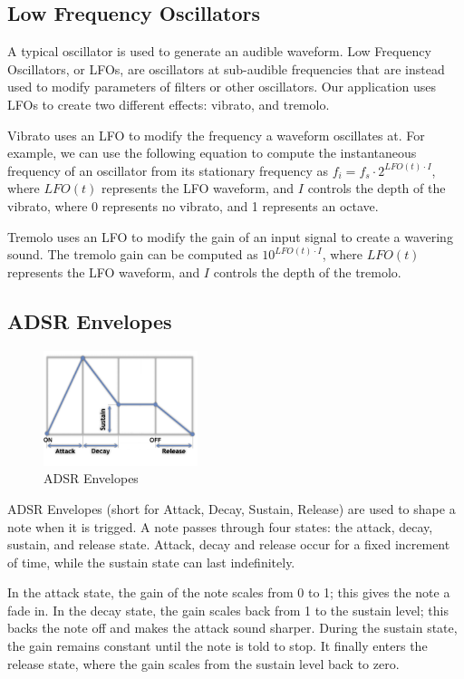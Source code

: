 \documentclass[letterpaper,12pt]{article}
\begin{document}
\subsection{Low Frequency Oscillators}

A typical oscillator is used to generate an audible waveform. Low Frequency Oscillators, or LFOs, are oscillators at sub-audible frequencies that are instead used to modify parameters of filters or other oscillators. Our application uses LFOs to create two different effects: vibrato, and tremolo.

Vibrato uses an LFO to modify the frequency a waveform oscillates at. For example, we can use the following equation to compute the instantaneous frequency of an oscillator from its stationary frequency as $f_i = f_s \cdot 2^{LFO(t) \cdot I}$, where $LFO(t)$ represents the LFO waveform, and $I$ controls the depth of the vibrato, where 0 represents no vibrato, and 1 represents an octave.

Tremolo uses an LFO to modify the gain of an input signal to create a wavering sound. The tremolo gain can be computed as $10^{LFO(t) \cdot I}$, where $LFO(t)$ represents the LFO waveform, and $I$ controls the depth of the tremolo.


\subsection{ADSR Envelopes}

\begin{figure}
\centering
\includegraphics[width=0.4\textwidth]{figures/adsr.png}
\caption{ADSR Envelopes}
\label{fig:adsr}
\end{figure}

ADSR Envelopes (short for Attack, Decay, Sustain, Release) are used to shape a note when it is trigged. A note passes through four states: the attack, decay, sustain, and release state. Attack, decay and release occur for a fixed increment of time, while the sustain state can last indefinitely.

In the attack state, the gain of the note scales from 0 to 1; this gives the note a fade in. In the decay state, the gain scales back from 1 to the sustain level; this backs the note off and makes the attack sound sharper. During the sustain state, the gain remains constant until the note is told to stop. It finally enters the release state, where the gain scales from the sustain level back to zero.
\end{document}

